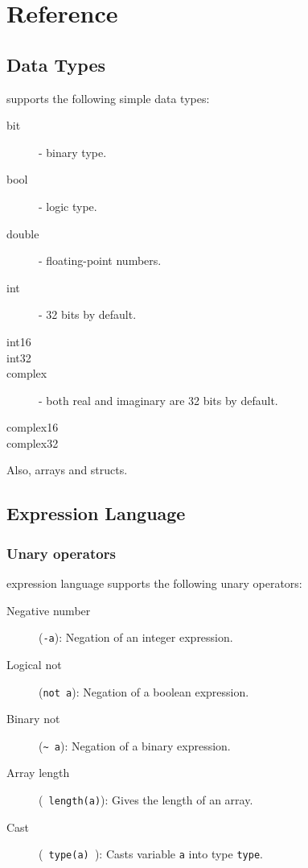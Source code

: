 \chapter{Reference}


\section{Data Types}

\LANG supports the following simple data types:
\begin{description}
\item[bit] - binary type.
\item[bool] - logic type.
\item[double] - floating-point numbers.
\item[int] - 32 bits by default.
\item[int16]
\item[int32]
\item[complex] - both real and imaginary are 32 bits by default.
\item[complex16]
\item[complex32]
\end{description}

Also, arrays and structs.



\section{Expression Language}

\subsection{Unary operators}

\LANG expression language supports the following unary operators:
\begin{description}
\item[Negative number] (\lstinline|-a|): Negation of an integer expression.
\item[Logical not] (\lstinline|not a|): Negation of a boolean expression.
\item[Binary not] (\lstinline|~ a|): Negation of a binary expression.
\item[Array length] (\lstinline| length(a)|): Gives the length of an array.
\item[Cast] (\lstinline| type(a) |): Casts variable \lstinline|a| into type \lstinline|type|.
\end{description}




